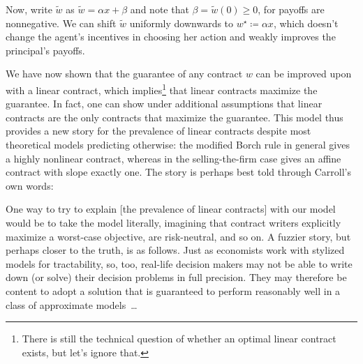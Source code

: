 Now, write \(\tilde{w}\) as \(\tilde{w} = \alpha x + \beta\) and note that \(\beta = \tilde{w}(0) \geq 0\), for payoffs are nonnegative.
We can shift \(\tilde{w}\) uniformly downwards to \(w^\star \coloneq \alpha x\), which doesn't change the agent's incentives in choosing her action and weakly improves the principal's payoffs.

We have now shown that the guarantee of any contract \(w\) can be improved upon with a linear contract, which implies\footnote{There is still the technical question of whether an optimal linear contract exists, but let's ignore that.} that linear contracts maximize the guarantee.
In fact, one can show under additional assumptions that linear contracts are the only contracts that maximize the guarantee.
This model thus provides a new story for the prevalence of linear contracts despite most theoretical models predicting otherwise: the modified Borch rule in general gives a highly nonlinear contract, whereas in the selling-the-firm case gives an affine contract with slope exactly one.
The story is perhaps best told through Carroll's own words:

\begin{displayquote}
One way to try to explain [the prevalence of linear contracts] with our model would be to take the model literally, imagining that contract writers explicitly maximize a worst-case objective, are risk-neutral, and so on. A fuzzier story, but perhaps closer to the truth, is as follows. Just as economists work with stylized models for tractability, so, too, real-life decision makers may not be able to write down (or solve) their decision problems in full precision. They may therefore be content to adopt a solution that is guaranteed to perform reasonably well in a class of approximate models~\dots
\end{displayquote}




